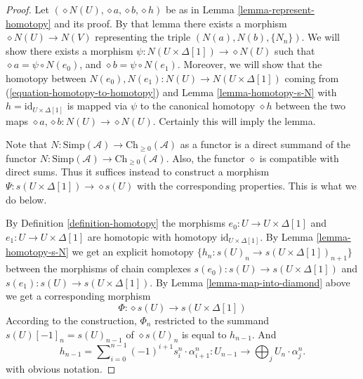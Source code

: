 \begin{proof}
Let $(\diamond N(U), \diamond a, \diamond b, \diamond h)$
be as in Lemma \ref{lemma-represent-homotopy} and its proof. By that lemma
there exists a morphism $\diamond N(U) \to N(V)$ representing
the triple $(N(a), N(b), \{N_n\})$. We will show
there exists a morphism
$\psi : N(U \times \Delta[1]) \to \diamond{N(U)}$
such that $\diamond a = \psi \circ N(e_0)$, and
$\diamond b = \psi \circ N(e_1)$. Moreover, we will
show that the homotopy between $N(e_0), N(e_1) :
N(U) \to N(U \times \Delta[1])$ coming from
(\ref{equation-homotopy-to-homotopy}) and
Lemma \ref{lemma-homotopy-s-N} with
$h = \text{id}_{U \times \Delta[1]}$ is mapped via
$\psi$ to the canonical homotopy $\diamond h$ between the two
maps $\diamond a, \diamond b : N(U) \to \diamond{N(U)}$. Certainly this
will imply the lemma.

\medskip\noindent
Note that $N : \text{Simp}(\mathcal{A}) \to \text{Ch}_{\geq 0}(\mathcal{A})$
as a functor is a direct summand of the functor
$N : \text{Simp}(\mathcal{A}) \to \text{Ch}_{\geq 0}(\mathcal{A})$.
Also, the functor $\diamond$ is compatible with direct sums.
Thus it suffices instead to construct a morphism
$\Psi : s(U \times \Delta[1]) \to \diamond{s(U)}$ with the
corresponding properties. This is what we do below.

\medskip\noindent
By Definition \ref{definition-homotopy}
the morphisms $e_0 : U \to U\times \Delta[1]$
and $e_1 : U \to U \times \Delta[1]$ are homotopic
with homotopy $\text{id}_{U\times \Delta[1]}$.
By Lemma \ref{lemma-homotopy-s-N}
we get an explicit homotopy
$\{h_n : s(U)_n \to s(U\times \Delta[1])_{n + 1}\}$
between the morphisms
of chain complexes $s(e_0) : s(U) \to s(U \times \Delta[1])$
and $s(e_1) : s(U) \to s(U \times \Delta[1])$. By
Lemma \ref{lemma-map-into-diamond} above we get a corresponding morphism
$$
\Phi : \diamond{s(U)} \to s(U \times \Delta[1])
$$
According to the construction, $\Phi_n$ restricted to the summand
$s(U)[-1]_n = s(U)_{n - 1}$ of $\diamond{s(U)}_n$
is equal to $h_{n - 1}$. And
$$
h_{n - 1} = \sum\nolimits_{i = 0}^{n - 1}
(-1)^{i + 1} s^n_i \cdot \alpha^n_{i + 1} :
U_{n - 1} \to \bigoplus\nolimits_j U_n \cdot \alpha^n_j.
$$
with obvious notation.


\end{proof}
